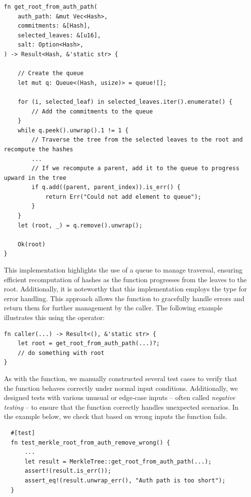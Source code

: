 \documentclass[11pt]{report}
\theoremstyle{definition}
\theoremstyle{plain}
\begin{document}
\begin{verbatim}
fn get_root_from_auth_path(
    auth_path: &mut Vec<Hash>,
    commitments: &[Hash],
    selected_leaves: &[u16],
    salt: Option<Hash>,
) -> Result<Hash, &'static str> {

    // Create the queue
    let mut q: Queue<(Hash, usize)> = queue![];

    for (i, selected_leaf) in selected_leaves.iter().enumerate() {
        // Add the commitments to the queue
    }
    while q.peek().unwrap().1 != 1 {
        // Traverse the tree from the selected leaves to the root and recompute the hashes
        ...
        // If we recompute a parent, add it to the queue to progress upward in the tree
        if q.add((parent, parent_index)).is_err() {
            return Err("Could not add element to queue");
        }
    }
    let (root, _) = q.remove().unwrap();

    Ok(root)
}
\end{verbatim}

This implementation highlights the use of a queue to manage traversal, ensuring efficient recomputation of hashes as the function progresses from the leaves to the root. Additionally, it is noteworthy that this implementation employs the  type for error handling. This approach allows the function to gracefully handle errors and return them for further management by the caller. The following example illustrates this using the  operator:

\begin{verbatim}
fn caller(...) -> Result<(), &'static str> {
    let root = get_root_from_auth_path(...)?;
    // do something with root
}
\end{verbatim}

As with the  function, we manually constructed several test cases to verify that the function behaves correctly under normal input conditions. Additionally, we designed tests with various unusual or edge-case inputs -- often called \textit{negative testing} -- to ensure that the function correctly handles unexpected scenarios. In the example below, we check that based on wrong inputs the function fails.

\begin{verbatim}
  #[test]
  fn test_merkle_root_from_auth_remove_wrong() {
      ...
      let result = MerkleTree::get_root_from_auth_path(...);
      assert!(result.is_err());
      assert_eq!(result.unwrap_err(), "Auth path is too short");
  }
\end{verbatim}
\end{document}
